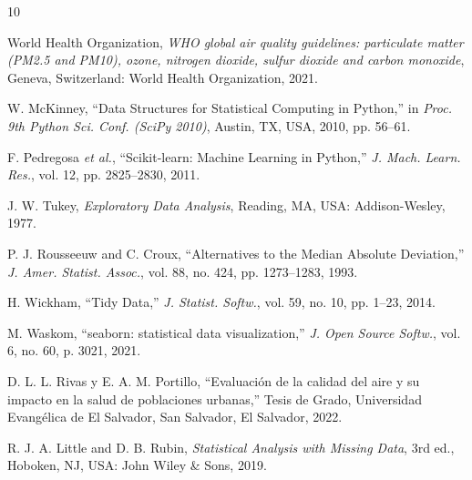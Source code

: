 \documentclass[journal,twocolumn,spanish]{IEEEtran}
\begin{document}
\begin{thebibliography}{10}

World Health Organization, \emph{WHO global air quality guidelines: particulate matter (PM2.5 and PM10), ozone, nitrogen dioxide, sulfur dioxide and carbon monoxide}, Geneva, Switzerland: World Health Organization, 2021.

W. McKinney, ``Data Structures for Statistical Computing in Python,'' in \emph{Proc. 9th Python Sci. Conf. (SciPy 2010)}, Austin, TX, USA, 2010, pp. 56--61.

F. Pedregosa \emph{et al.}, ``Scikit-learn: Machine Learning in Python,'' \emph{J. Mach. Learn. Res.}, vol. 12, pp. 2825--2830, 2011.

J. W. Tukey, \emph{Exploratory Data Analysis}, Reading, MA, USA: Addison-Wesley, 1977.

P. J. Rousseeuw and C. Croux, ``Alternatives to the Median Absolute Deviation,'' \emph{J. Amer. Statist. Assoc.}, vol. 88, no. 424, pp. 1273--1283, 1993.

H. Wickham, ``Tidy Data,'' \emph{J. Statist. Softw.}, vol. 59, no. 10, pp. 1--23, 2014.

M. Waskom, ``seaborn: statistical data visualization,'' \emph{J. Open Source Softw.}, vol. 6, no. 60, p. 3021, 2021.

D. L. L. Rivas y E. A. M. Portillo, ``Evaluación de la calidad del aire y su impacto en la salud de poblaciones urbanas,'' Tesis de Grado, Universidad Evangélica de El Salvador, San Salvador, El Salvador, 2022.

R. J. A. Little and D. B. Rubin, \emph{Statistical Analysis with Missing Data}, 3rd ed., Hoboken, NJ, USA: John Wiley \& Sons, 2019.

\end{thebibliography}
\end{document}
